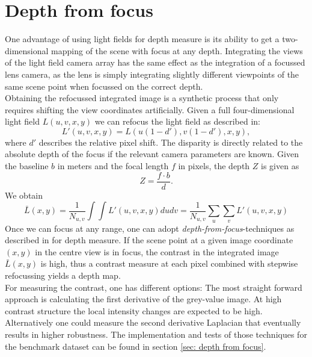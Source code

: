 \documentclass  [
  paper    = a4,
  BCOR     = 10mm,
  twoside,
  fontsize = 12pt,
  fleqn,
  toc      = bibnumbered,
  toc      = listofnumbered,
  numbers  = noendperiod,
  headings = normal,
  listof   = leveldown,
  version  = 3.03
]                                       {scrreprt}
\begin{document}
\section{Depth from focus}
\label{sec:theo depth}
One advantage of using light fields for depth measure is its ability to get a two-dimensional mapping of the scene with focus at any depth. Integrating the views of the light field camera array has the same effect as the integration of a focussed lens camera, as the lens is simply integrating slightly different viewpoints of the same scene point when focussed on the correct depth. \\
 Obtaining the refocussed integrated image is a synthetic process that only requires shifting the view coordinates artificially. Given a full four-dimensional light field $L(u, v, x, y)$ we can refocus the light field as described in\cite{ng2005light}:
 \begin{equation}\label{eq:refocus}
L'(u, v, x, y) = L(u(1-d'), v(1-d'), x, y),
\end{equation}
where $d'$ describes the relative pixel shift. The disparity is directly related to the absolute depth of the focus if the relevant camera parameters are  known. Given the baseline $b$ in meters and the focal length $f$ in pixels, the depth $Z$ is given as \begin{equation}\label{key}
Z = \frac{f\cdot b}{d}.
\end{equation} 
We obtain
\begin{equation}\label{key}
\bar{L}(x,y) = \frac{1}{N_{u,v}}\int\int L'(u, v, x, y) du  dv =\frac{1}{N_{u,v}}\sum_{u}\sum_{v}  L'(u, v, x, y)
\end{equation}
Once we can focus at any range, one can adopt \textit{depth-from-focus}-techniques as described in \cite{watanabe1998rational} for depth measure. If the scene point at a given image coordinate $(x, y)$ in the centre view is in focus, the contrast in the integrated image $\bar{L}(x,y)$ is high, thus a contrast measure at each pixel combined with stepwise refocussing yields a depth map. \\
For measuring the contrast, one has different options: The most straight forward approach is calculating the first derivative of the grey-value image. At high contrast structure the local intensity changes are expected to be high. Alternatively one could measure the second derivative Laplacian that eventually results in higher robustness. The implementation and tests of those techniques for the benchmark dataset can be found in section \ref{sec: depth from focus}.\\
\end{document}

